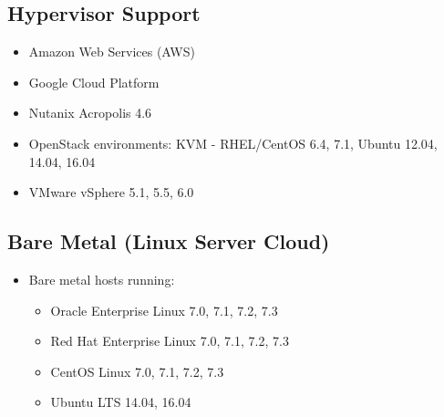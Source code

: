 \documentclass[letterpaper,10pt,english]{sphinxmanual}
\begin{document}
\subsection{Hypervisor Support}
\label{\detokenize{getting_started/requirements_ecosystem:hypervisor-support}}\begin{itemize}
\item {} 
Amazon Web Services (AWS)

\item {} 
Google Cloud Platform

\item {} 
Nutanix Acropolis 4.6

\item {} 
OpenStack environments: KVM - RHEL/CentOS 6.4, 7.1, Ubuntu 12.04, 14.04, 16.04

\item {} 
VMware vSphere 5.1, 5.5, 6.0

\end{itemize}


\subsection{Bare Metal (Linux Server Cloud)}
\label{\detokenize{getting_started/requirements_ecosystem:bare-metal-linux-server-cloud}}\begin{itemize}
\item {} 
Bare metal hosts running:
\begin{itemize}
\item {} 
Oracle Enterprise Linux 7.0, 7.1, 7.2, 7.3

\item {} 
Red Hat Enterprise Linux 7.0, 7.1, 7.2, 7.3

\item {} 
CentOS Linux 7.0, 7.1, 7.2, 7.3

\item {} 
Ubuntu LTS 14.04, 16.04

\end{itemize}

\end{itemize}
\end{document}
